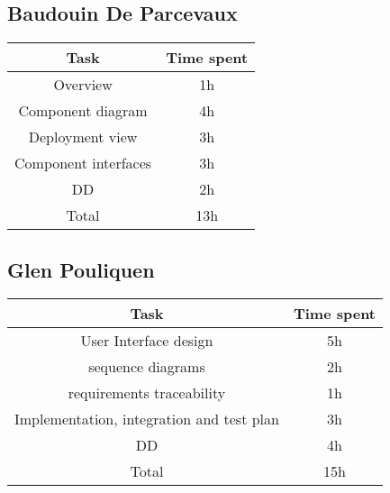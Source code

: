 \subsection{Baudouin De Parcevaux}
\begin{tabular}{| c | c | }
	\hline
	\textbf{Task} & \textbf{Time spent} \\ 
	\hline\hline
 	Overview & 1h\\
 	Component diagram & 4h\\
 	Deployment view & 3h\\
 	Component interfaces & 3h\\
 	DD & 2h\\
	\hline
	Total & 13h \\
	\hline
\end{tabular}

\subsection{Glen Pouliquen}
\begin{tabular}{| c | c | }
	\hline
	\textbf{Task} & \textbf{Time spent} \\ 
	\hline\hline
	User Interface design& 5h\\
	sequence diagrams& 2h\\
	requirements traceability & 1h\\
	Implementation, integration and test plan& 3h\\
	DD & 4h\\
	\hline
	Total & 15h \\
	\hline
\end{tabular}